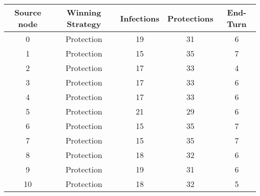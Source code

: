 \documentclass[results.tex]{subfiles}
\begin{document}
    \begin{center}
        \begin{tabular}{| c || c | c | c | c |}
            \hline
            {\bfseries Source node} & {\bfseries Winning Strategy} & {\bfseries Infections} & {\bfseries Protections}
            & {\bfseries End-Turn}
            \\  %
            \hline\hline
            0                       & Protection                   & 19                     & 31                      & 6                    \\
            \hline
            1                       & Protection                   & 15                     & 35                      & 7                    \\
            \hline
            2                       & Protection                   & 17                     & 33                      & 4                    \\
            \hline
            3                       & Protection                   & 17                     & 33                      & 6                    \\
            \hline
            4                       & Protection                   & 17                     & 33                      & 6                    \\
            \hline
            5                       & Protection                   & 21                     & 29                      & 6                    \\
            \hline
            6                       & Protection                   & 15                     & 35                      & 7                    \\
            \hline
            7                       & Protection                   & 15                     & 35                      & 7                    \\
            \hline
            8                       & Protection                   & 18                     & 32                      & 6                    \\
            \hline
            9                       & Protection                   & 19                     & 31                      & 6                    \\
            \hline
            10                      & Protection                   & 18                     & 32                      & 5                    \\

\end{tabular}
\end{center}
\end{document}
